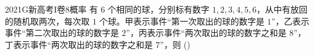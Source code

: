 
\begin{problem}{2021}{G}{新高考I卷}{8}{概率}
有 $ 6 $ 个相同的球，分别标有数字 $ 1,2,3,4,5,6 $，从中有放回的随机取两次，每次取 $1$ 个球。甲表示事件“第一次取出的球的数字是 $ 1 $”，乙表示事件“第二次取出的球的数字是 $2$”，丙表示事件“两次取出的球的数字之和是 $ 8 $”，丁表示事件“两次取出的球的数字之和是 $ 7 $”，则 (\hspace{1cm})
\end{problem}

\begin{choices}
\end{choices}